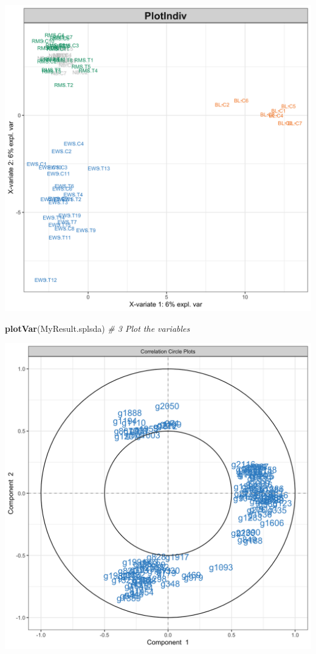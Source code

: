 \documentclass[]{book}
\newenvironment{Shaded}{\begin{snugshade}}{\end{snugshade}}
\newcommand{\CommentTok}[1]{\textcolor[rgb]{0.56,0.35,0.01}{\textit{#1}}}
\newcommand{\KeywordTok}[1]{\textcolor[rgb]{0.13,0.29,0.53}{\textbf{#1}}}
\newcommand{\NormalTok}[1]{#1}
\begin{document}
\begin{center}\includegraphics[width=0.75\linewidth,]{Figures/04-splsda-and-plots-1} \end{center}

\begin{Shaded}
\begin{Highlighting}[]
\KeywordTok{plotVar}\NormalTok{(MyResult.splsda)                            }\CommentTok{# 3 Plot the variables}
\end{Highlighting}
\end{Shaded}

\begin{center}\includegraphics[width=0.75\linewidth,]{Figures/04-splsda-and-plots-2} \end{center}
\end{document}
